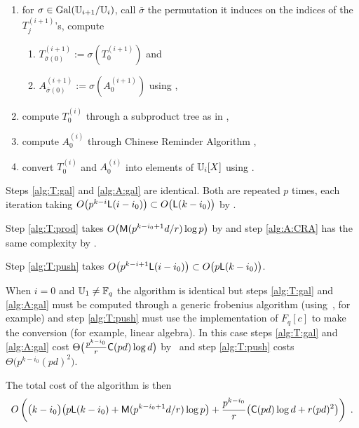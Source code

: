 \begin{enumerate}
\item for $\sigma \in \operatorname{Gal}(\mathbb{U}_{i+1}/\mathbb{U}_i)$, call $\bar\sigma$ the
  permutation it induces on the indices of the $T_j^{(i+1)}$'s,
  compute
  \begin{enumerate}
  \item\label{alg:T:gal} $T_{\bar\sigma(0)}^{(i+1)} :=
    \sigma\left(T_0^{(i+1)}\right)$ and
  \item\label{alg:A:gal} $A_{\bar\sigma(0)}^{(i+1)} :=
    \sigma\left(A_0^{(i+1)}\right)$ using
    \cite[]{DFS09},
  \end{enumerate}
\item\label{alg:T:prod} compute $T_0^{(i)}$ through a subproduct tree
  as in \cite[Algo. 10.3]{vzGG},
\item\label{alg:A:CRA} compute $A_0^{(i)}$ through Chinese Reminder
  Algorithm \cite[Algo. 10.16]{vzGG},
\item\label{alg:T:push} convert $T_0^{(i)}$ and $A_0^{(i)}$ into
  elements of $\mathbb{U}_i[X]$ using \cite[]{DFS09}.
\end{enumerate}

Steps \ref{alg:T:gal} and \ref{alg:A:gal} are identical. Both are
repeated $p$ times, each iteration taking $O\bigl(p^{k-i}{\sf
  L}(i-i_0)\bigr) \subset O\bigl({\sf L}(k-i_0)\bigr)$ by
\cite[Th. 17]{DFS09}.

Step \ref{alg:T:prod} takes $O\bigl(\mathrm{\sf M}(p^{k-i_0+1}d/r)\log p\bigr)$
by \cite[Lemma 10.4]{vzGG} and step \ref{alg:A:CRA} has the same
complexity by \cite[Coro. 10.17]{vzGG}.

Step \ref{alg:T:push} takes $O\bigl(p^{k-i+1}{\sf L}(i-i_0)\bigr)
\subset O\bigl(p{\sf L}(k-i_0)\bigr)$.

When $i=0$ and $\mathbb{U}_1\ne\mathbb{F}_q$ the algorithm is identical but steps
\ref{alg:T:gal} and \ref{alg:A:gal} must be computed through a generic
frobenius algorithm (using~\cite[Algorithm 5.2]{vzGS92}, for example)
and step \ref{alg:T:push} must use the implementation of $F_q[c]$ to
make the conversion (for example, linear algebra). In this case steps
\ref{alg:T:gal} and \ref{alg:A:gal} cost
$\Theta\bigl(\frac{p^{k-i_0}}{r}\mathrm{\sf C}(pd)\log d \bigr)$
by~\cite[Lemma 5.3]{vzGS92} and step \ref{alg:T:push} costs
$\Theta\bigl(p^{k-i_0}(pd)^2\bigr)$.

The total cost of the algorithm is then
\begin{equation*}
  \label{eq:T:complexity}
  O\left(\bigl(k-i_0\bigr)\bigl(p{\sf L}(k-i_0) + \mathrm{\sf M}(p^{k-i_0+1}d/r)\log p\bigr) +
    \frac{p^{k-i_0}}{r}\bigl(\mathrm{\sf C}(pd)\log d + r(pd)^2\bigr) \right)
  \;\text{.}
\end{equation*}

